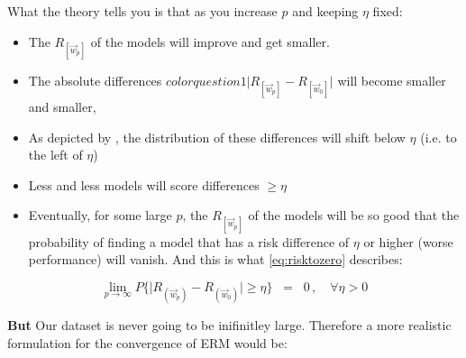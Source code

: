 {\begin{frame}
\begin{itemize}
			What the theory tells you is that as you increase $p$ and keeping $\eta$ fixed:
			\begin{itemize}
			\item The $R_{[\vec w_p]}$ of the models will improve and get smaller.
			\item The absolute differences ${color{question1}\Big|R_{[\vec w_p]} - R_{[\vec w_0]}\Big|}$ will become smaller and smaller,
			\item As depicted by , the distribution of these differences will shift below $\eta$ (i.e. to the left of $\eta$)
			\item Less and less models will score differences $\ge \eta$
			\item Eventually, for some large $p$, the $R_{[\vec w_p]}$ of the models will be so good that the probability of finding a model that has a risk difference of $\eta$ or higher (worse performance) will vanish. And this is what \eqref{eq:risktozero} describes:
			\end{itemize}
			
			\end{itemize}
			
			\begin{equation}
				\lim_{p \to \infty} P\bigg\{ 
					{
						\Big|R_{(\vec w_p)} - R_{(\vec w_0)}\Big| 
					}
				\geq \eta \bigg\}\;\;=\;\; 0 \,, \quad \forall \eta > 0
				\label{eq:risktozero}
			\end{equation}
			
			\textbf{But} Our dataset is never going to be inifinitley large. Therefore a more realistic formulation for the convergence of ERM would be:
\end{frame}
}
